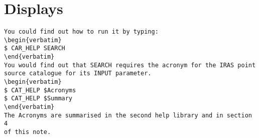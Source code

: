 \newpage

\section{Displays}

\verb+You could find out how to run it by typing:+\\
\verb+\begin{verbatim}+\\
\hspace*{10mm}\verb+$ CAR_HELP SEARCH+\\
\verb+\end{verbatim}+\\
\verb+You would find out that SEARCH requires the acronym for the IRAS point+\\
\verb+source catalogue for its INPUT parameter.+\\
\verb+\begin{verbatim}+\\
\hspace*{10mm}\verb+$ CAT_HELP $Acronyms+\\
\hspace*{10mm}\verb+$ CAT_HELP $Summary+\\
\verb+\end{verbatim}+\\
\verb+The Acronyms are summarised in the second help library and in section 4+\\
\verb+of this note.+\\
